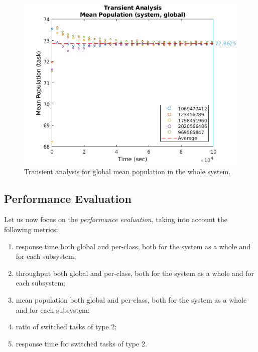 \begin{figure}
	\includegraphics[width=\columnwidth]{fig/evaluation-transient-analysis-mean-population}
	\caption{Transient analysis for global mean population in the whole system.}
	\label{fig:evaluation-transient-analysis-mean-population}
\end{figure}


\subsection{Performance Evaluation}
Let us now focus on the \textit{performance evaluation}, taking into account the following metrics:

\begin{enumerate}
	\item response time both global and per-class, both for the system as a whole and for each subsystem;
	\item throughput both global and per-class, both for the system as a whole and for each subsystem;
	\item mean population both global and per-class, both for the system as a whole and for each subsystem;
	\item ratio of switched tasks of type 2;
	\item response time for switched tasks of type 2.
\end{enumerate}

